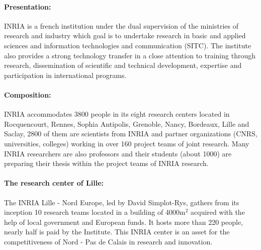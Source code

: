\paragraph{Presentation:} \gls{INRIA} is a french institution under the dual supervision of the ministries of research and industry which goal is to undertake research in basic and applied sciences and information technologies and communication (SITC). The institute also provides a strong technology transfer in a close attention to training through research, dissemination of scientific and technical development, expertise and participation in international programs.

\paragraph{Composition: } \gls{INRIA} accommodates 3800 people in its eight research centers located in Rocquencourt, Rennes, Sophia Antipolis, Grenoble, Nancy, Bordeaux, Lille and Saclay, 2800 of them are scientists from \gls{INRIA} and partner organizations (CNRS, universities, colleges) working in over 160 project teams of joint research. Many \gls{INRIA} researchers are also professors and their students (about 1000) are preparing their thesis within the project teams of \gls{INRIA} research.

\paragraph{The research center of Lille: } The \gls{INRIA}  Lille - Nord Europe, led by David Simplot-Rys, gathers from its inception 10 research teams located in a building of 4000m$^2$ acquired with the help of local government and European funds. It hosts more than 220 people, nearly half is paid by the Institute. This \gls{INRIA}  center is an asset for the competitiveness of Nord - Pas de Calais in research and innovation.
